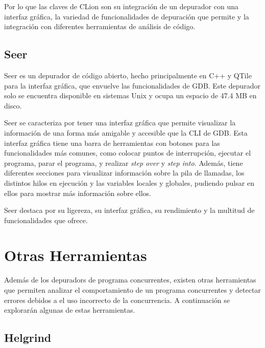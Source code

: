 Por lo que las claves de CLion son su integración de un \gls{depurador} con una \gls{interfaz gráfica}, la variedad de funcionalidades de depuración que permite y la integración con diferentes herramientas de análisis de código.


\subsection{Seer}{\label{subsec:seer}}
Seer es un depurador de \gls{código abierto}, hecho principalmente en C++ y QTile para la \gls{interfaz gráfica}, que envuelve las funcionalidades de GDB. Este \gls{depurador} solo se encuentra disponible en sistemas Unix y ocupa un espacio de 47.4 MB en disco. 

Seer se caracteriza por tener una \gls{interfaz gráfica} que permite visualizar la información de una forma más amigable y accesible que la \gls{CLI} de GDB. Esta interfaz gráfica tiene una barra de herramientas con botones para las funcionalidades más comunes, como colocar puntos de interrupción, ejecutar el programa, parar el programa, y realizar \textit{\gls{step over}} y \textit{\gls{step into}}. Además, tiene diferentes secciones para visualizar información sobre la pila de llamadas, los distintos \glspl{hilo} en ejecución y las variables locales y globales, pudiendo pulsar en ellos para mostrar más información sobre ellos.

Seer destaca por su ligereza, su \gls{interfaz gráfica}, su rendimiento y la multitud de funcionalidades que ofrece.


\section{Otras Herramientas}\label{sec:herramientas}

Además de los \glspl{depurador} de \glspl{programa concurrente}, existen otras herramientas que permiten analizar el comportamiento de un \glspl{programa concurrente} y detectar errores debidos a el uso incorrecto de la \gls{concurrencia}. A continuación se explorarán algunas de estas herramientas.

\subsection{Helgrind}{\label{subsec:helgrind}}

